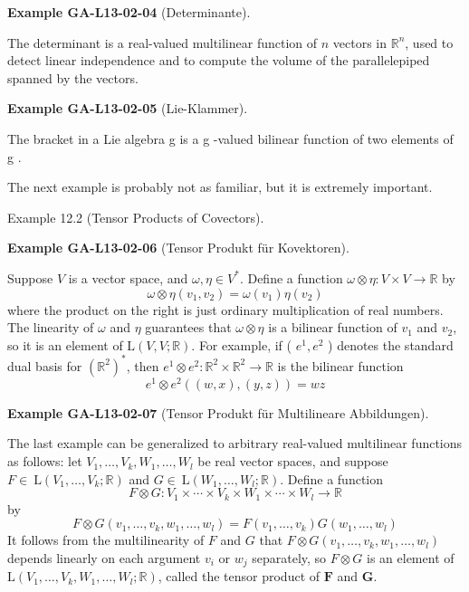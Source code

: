 \documentclass[10pt, letterpaper]{article}
\newcommand{\CustomHeading}[3]{%
  \par\medskip\noindent%
  \textbf{#1 #2} \textnormal{(#3)}.\enskip%
}
\newenvironment{EXA}[2]{\begin{unitbox}\CustomHeading{Example}{#1}{#2}}{\end{unitbox}}
\begin{document}
\begin{EXA}{GA-L13-02-04}{Determinante}
The determinant is a real-valued multilinear function of $n$ vectors in $\mathbb{R}^{n}$, used to detect linear independence and to compute the volume of the parallelepiped spanned by the vectors.
\end{EXA}



\begin{EXA}{GA-L13-02-05}{Lie-Klammer}
The bracket in a Lie algebra g is a g -valued bilinear function of two elements of g .
\end{EXA}


The next example is probably not as familiar, but it is extremely important.


Example 12.2 (Tensor Products of Covectors). 

\begin{EXA}{GA-L13-02-06}{Tensor Produkt für Kovektoren}
Suppose $V$ is a vector space, and $\omega, \eta \in V^{*}$. Define a function $\omega \otimes \eta: V \times V \rightarrow \mathbb{R}$ by
$$
\omega \otimes \eta\left(v_{1}, v_{2}\right)=\omega\left(v_{1}\right) \eta\left(v_{2}\right)
$$
where the product on the right is just ordinary multiplication of real numbers. The linearity of $\omega$ and $\eta$ guarantees that $\omega \otimes \eta$ is a bilinear function of $v_{1}$ and $v_{2}$, so it is an element of $\mathrm{L}(V, V ; \mathbb{R})$. For example, if ( $e^{1}, e^{2}$ ) denotes the standard dual basis for $\left(\mathbb{R}^{2}\right)^{*}$, then $e^{1} \otimes e^{2}: \mathbb{R}^{2} \times \mathbb{R}^{2} \rightarrow \mathbb{R}$ is the bilinear function
$$
e^{1} \otimes e^{2}((w, x),(y, z))=w z
$$
\end{EXA}



\begin{EXA}{GA-L13-02-07}{Tensor Produkt für Multilineare Abbildungen}
The last example can be generalized to arbitrary real-valued multilinear functions as follows: let $V_{1}, \ldots, V_{k}, W_{1}, \ldots, W_{l}$ be real vector spaces, and suppose $F \in \mathrm{~L}\left(V_{1}, \ldots, V_{k} ; \mathbb{R}\right)$ and $G \in \mathrm{~L}\left(W_{1}, \ldots, W_{l} ; \mathbb{R}\right)$. Define a function
$$
F \otimes G: V_{1} \times \cdots \times V_{k} \times W_{1} \times \cdots \times W_{l} \rightarrow \mathbb{R}
$$
by
$$
F \otimes G\left(v_{1}, \ldots, v_{k}, w_{1}, \ldots, w_{l}\right)=F\left(v_{1}, \ldots, v_{k}\right) G\left(w_{1}, \ldots, w_{l}\right)
$$
It follows from the multilinearity of $F$ and $G$ that $F \otimes G\left(v_{1}, \ldots, v_{k}, w_{1}, \ldots, w_{l}\right)$ depends linearly on each argument $v_{i}$ or $w_{j}$ separately, so $F \otimes G$ is an element of $\mathrm{L}\left(V_{1}, \ldots, V_{k}, W_{1}, \ldots, W_{l} ; \mathbb{R}\right)$, called the tensor product of $\boldsymbol{F}$ and $\boldsymbol{G}$.
\end{EXA}
\end{document}
